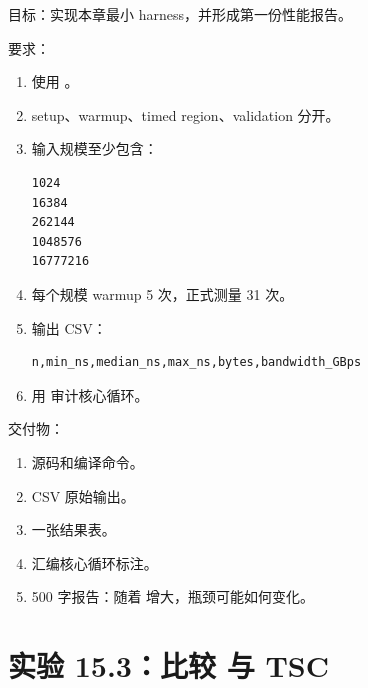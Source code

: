 \begin{labbox}
目标：实现本章最小 harness，并形成第一份性能报告。

要求：

\begin{enumerate}
  \item 使用 。
  \item setup、warmup、timed region、validation 分开。
  \item 输入规模至少包含：
\begin{lstlisting}
1024
16384
262144
1048576
16777216
\end{lstlisting}
  \item 每个规模 warmup 5 次，正式测量 31 次。
  \item 输出 CSV：
\begin{lstlisting}
n,min_ns,median_ns,max_ns,bytes,bandwidth_GBps
\end{lstlisting}
  \item 用  审计核心循环。
\end{enumerate}

交付物：

\begin{enumerate}
  \item 源码和编译命令。
  \item CSV 原始输出。
  \item 一张结果表。
  \item 汇编核心循环标注。
  \item 500 字报告：随着  增大，瓶颈可能如何变化。
\end{enumerate}
\end{labbox}

\section{实验 15.3：比较  与 TSC}

